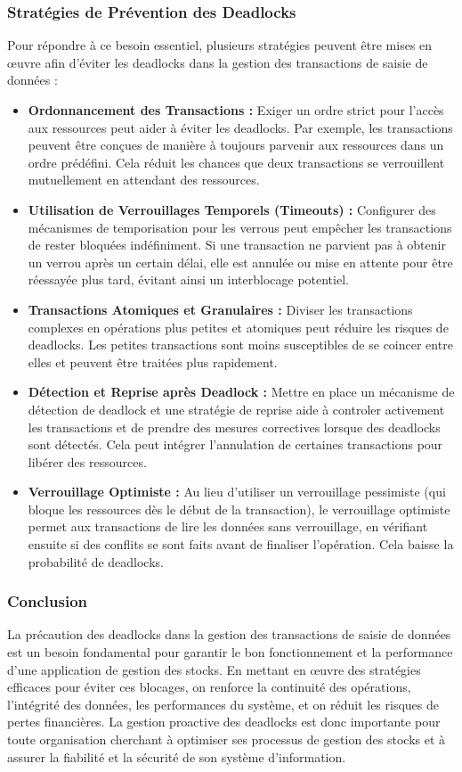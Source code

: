 \documentclass[a4paper, oneside, 12pt, final]{extreport}
\begin{document}
\subsubsection{Stratégies de Prévention des Deadlocks}
Pour répondre à ce besoin essentiel, plusieurs stratégies peuvent être mises en œuvre afin d'éviter les deadlocks dans la gestion des transactions de saisie de données :
\begin{itemize}
\item \textbf{Ordonnancement des Transactions :} Exiger un ordre strict pour l'accès aux ressources peut aider à éviter les deadlocks. Par exemple, les transactions peuvent être conçues de manière à toujours parvenir aux ressources dans un ordre prédéfini. Cela réduit les chances que deux transactions se verrouillent mutuellement en attendant des ressources.

\item \textbf{Utilisation de Verrouillages Temporels (Timeouts) :} Configurer des mécanismes de temporisation pour les verrous peut empêcher les transactions de rester bloquées indéfiniment. Si une transaction ne parvient pas à obtenir un verrou après un certain délai, elle est annulée ou mise en attente pour être réessayée plus tard, évitant ainsi un interblocage potentiel.

\item \textbf{Transactions Atomiques et Granulaires :} Diviser les transactions complexes en opérations plus petites et atomiques peut réduire les risques de deadlocks. Les petites transactions sont moins susceptibles de se coincer entre elles et peuvent être traitées plus rapidement.

\item \textbf{Détection et Reprise après Deadlock :} Mettre en place un mécanisme de détection de deadlock et une stratégie de reprise aide à controler activement les transactions et de prendre des mesures correctives lorsque des deadlocks sont détectés. Cela peut intégrer l'annulation de certaines transactions pour libérer des ressources.

\item \textbf{Verrouillage Optimiste :} Au lieu d'utiliser un verrouillage pessimiste (qui bloque les ressources dès le début de la transaction), le verrouillage optimiste permet aux transactions de lire les données sans verrouillage, en vérifiant ensuite si des conflits se sont faits avant de finaliser l'opération. Cela baisse la probabilité de deadlocks.
\end{itemize}
\subsubsection{Conclusion}
La précaution des deadlocks dans la gestion des transactions de saisie de données est un besoin fondamental pour garantir le bon fonctionnement et la performance d'une application de gestion des stocks. En mettant en œuvre des stratégies efficaces pour éviter ces blocages, on renforce la continuité des opérations, l'intégrité des données, les performances du système, et on réduit les risques de pertes financières. La gestion proactive des deadlocks est donc importante pour toute organisation cherchant à optimiser ses processus de gestion des stocks et à assurer la fiabilité et la sécurité de son système d'information.
\end{document}
